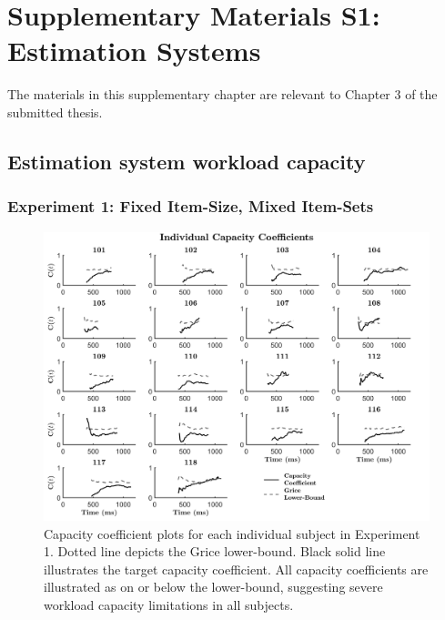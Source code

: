 \chapter{Supplementary Materials S1: \\ Estimation Systems}
\label{Appendix:A_EstimationSystems}

\noindent The materials in this supplementary chapter are relevant to Chapter 3 of the submitted thesis.

\setcounter{page}{1}
\setcounter{equation}{0}
\setcounter{figure}{0}
\setcounter{table}{0}
\setcounter{section}{0}
\renewcommand\thefigure{S1\thesection.\arabic{figure}}
\renewcommand\thetable{S1\thesection.\arabic{table}}

\newpage

\section{Estimation system workload capacity}
\label{Appendix:A_EstWorkload}

\subsection{Experiment 1: Fixed Item-Size, Mixed Item-Sets}
\begin{figure}[htb]
\begin{center}
\includegraphics[width=\linewidth]{Figures/Appendix/FIG16JPG.jpg}
\caption{Capacity coefficient plots for each individual subject in Experiment 1. Dotted line depicts the Grice lower-bound. Black solid line illustrates the target capacity coefficient. All capacity coefficients are illustrated as on or below the lower-bound, suggesting severe workload capacity limitations in all subjects.}
\label{fig:Indiv_Cap_Ex1}
\end{center}
\end{figure}

